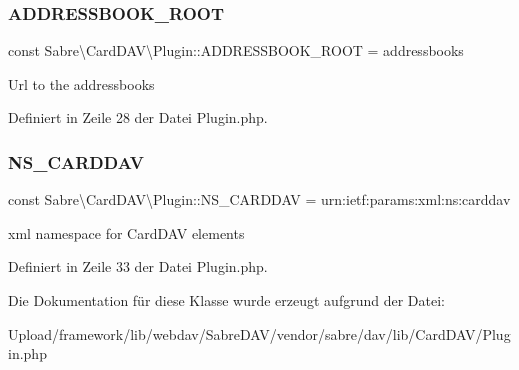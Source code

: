 \subsubsection{\texorpdfstring{A\+D\+D\+R\+E\+S\+S\+B\+O\+O\+K\+\_\+\+R\+O\+OT}{ADDRESSBOOK\_ROOT}}
{\footnotesize\ttfamily const Sabre\textbackslash{}\+Card\+D\+A\+V\textbackslash{}\+Plugin\+::\+A\+D\+D\+R\+E\+S\+S\+B\+O\+O\+K\+\_\+\+R\+O\+OT = \textquotesingle{}addressbooks\textquotesingle{}}

Url to the addressbooks 

Definiert in Zeile 28 der Datei Plugin.\+php.

\mbox{\label{class_sabre_1_1_card_d_a_v_1_1_plugin_ab2f9b3534cc38e89d3905dd6ea1ee042}} 
\subsubsection{\texorpdfstring{N\+S\+\_\+\+C\+A\+R\+D\+D\+AV}{NS\_CARDDAV}}
{\footnotesize\ttfamily const Sabre\textbackslash{}\+Card\+D\+A\+V\textbackslash{}\+Plugin\+::\+N\+S\+\_\+\+C\+A\+R\+D\+D\+AV = \textquotesingle{}urn\+:ietf\+:params\+:xml\+:ns\+:carddav\textquotesingle{}}

xml namespace for Card\+D\+AV elements 

Definiert in Zeile 33 der Datei Plugin.\+php.



Die Dokumentation für diese Klasse wurde erzeugt aufgrund der Datei\+:\begin{DoxyCompactItemize}
\item 
Upload/framework/lib/webdav/\+Sabre\+D\+A\+V/vendor/sabre/dav/lib/\+Card\+D\+A\+V/Plugin.\+php\end{DoxyCompactItemize}
